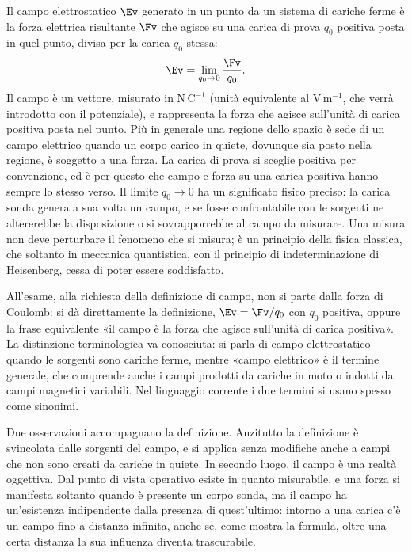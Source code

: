 \documentclass[main.tex]{subfiles}
\begin{document}
Il campo elettrostatico $\Ev$ generato in un punto da un sistema di cariche ferme è la forza elettrica risultante $\Fv$ che agisce su una carica di prova $q_0$ positiva posta in quel punto, divisa per la carica $q_0$ stessa:
\[
\Ev=\lim_{q_0\to 0}\frac{\Fv}{q_0} .
\]
Il campo è un vettore, misurato in $\mathrm{N\,C^{-1}}$ (unità equivalente al $\mathrm{V\,m^{-1}}$, che verrà introdotto con il potenziale), e rappresenta la forza che agisce sull'unità di carica positiva posta nel punto. Più in generale una regione dello spazio è sede di un campo elettrico quando un corpo carico in quiete, dovunque sia posto nella regione, è soggetto a una forza. La carica di prova si sceglie positiva per convenzione, ed è per questo che campo e forza su una carica positiva hanno sempre lo stesso verso. Il limite $q_0\to0$ ha un significato fisico preciso: la carica sonda genera a sua volta un campo, e se fosse confrontabile con le sorgenti ne altererebbe la disposizione o si sovrapporrebbe al campo da misurare. Una misura non deve perturbare il fenomeno che si misura; è un principio della fisica classica, che soltanto in meccanica quantistica, con il principio di indeterminazione di Heisenberg, cessa di poter essere soddisfatto.

All'esame, alla richiesta della definizione di campo, non si parte dalla forza di Coulomb: si dà direttamente la definizione, $\Ev=\Fv/q_0$ con $q_0$ positiva, oppure la frase equivalente «il campo è la forza che agisce sull'unità di carica positiva». La distinzione terminologica va conosciuta: si parla di campo elettrostatico quando le sorgenti sono cariche ferme, mentre «campo elettrico» è il termine generale, che comprende anche i campi prodotti da cariche in moto o indotti da campi magnetici variabili. Nel linguaggio corrente i due termini si usano spesso come sinonimi.

Due osservazioni accompagnano la definizione. Anzitutto la definizione è svincolata dalle sorgenti del campo, e si applica senza modifiche anche a campi che non sono creati da cariche in quiete. In secondo luogo, il campo è una realtà oggettiva. Dal punto di vista operativo esiste in quanto misurabile, e una forza si manifesta soltanto quando è presente un corpo sonda, ma il campo ha un'esistenza indipendente dalla presenza di quest'ultimo: intorno a una carica c'è un campo fino a distanza infinita, anche se, come mostra la formula, oltre una certa distanza la sua influenza diventa trascurabile.
\end{document}
